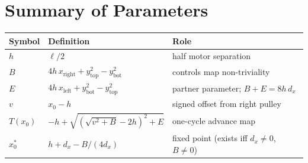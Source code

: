 \documentclass[11pt]{article}
\begin{document}
\section{Summary of Parameters}

\begin{center}
\begin{tabular}{lll}
\toprule
Symbol & Definition & Role \\
\midrule
$h$ & $\ell/2$ & half motor separation \\
$B$ & $4h\,x_{\mathrm{right}} + y_{\mathrm{top}}^2 - y_{\mathrm{bot}}^2$
    & controls map non-triviality \\
$E$ & $4h\,x_{\mathrm{left}} + y_{\mathrm{bot}}^2 - y_{\mathrm{top}}^2$
    & partner parameter; $B + E = 8h\,d_x$ \\
$v$ & $x_0 - h$ & signed offset from right pulley \\
$T(x_0)$ & $-h + \sqrt{(\sqrt{v^2+B}-2h)^2+E}$
          & one-cycle advance map \\
$x_0^*$ & $h + d_x - B/(4d_x)$ & fixed point (exists iff $d_x \ne 0$, $B \ne 0$) \\
\bottomrule
\end{tabular}
\end{center}
\end{document}
